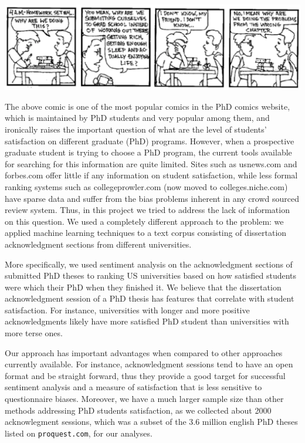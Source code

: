 \begin{center}
\includegraphics[scale=0.5]{img/phd1029.pdf}
\end{center}


The above comic is one of the most popular comics in the PhD comics
website, which is maintained by PhD students and very popular among
them, and ironically raises the important question of what are the
level of students' satisfaction on different graduate (PhD) programs.
However, when a prospective graduate student is trying to choose a
PhD program, the current tools available for searching for this information
are quite limited. Sites such as usnews.com and forbes.com offer little
if any information on student satisfaction, while less formal ranking
systems such as collegeprowler.com (now moved to colleges.niche.com)
have sparse data and suffer from the bias problems inherent in any
crowd sourced review system. Thus, in this project we tried to address
the lack of information on this question. We used a completely different
approach to the problem: we applied machine learning techniques to
a text corpus consisting of dissertation acknowledgment sections from
different universities. 

More specifically, we used sentiment analysis on the acknowledgment
sections of submitted PhD theses to ranking US universities based
on how satisfied students were which their PhD when they finished
it. We believe that the dissertation acknowledgment session of a PhD
thesis has features that correlate with student satisfaction. For
instance, universities with longer and more positive acknowledgments
likely have more satisfied PhD student than universities with more
terse ones.

Our approach has important advantages when compared to other approaches
currently available. For instance, acknowledgment sessions tend to
have an open format and be straight forward, thus they provide a good
target for successful sentiment analysis and a measure of satisfaction
that is less sensitive to questionnaire biases. Moreover, we have
a much larger sample size than other methods addressing PhD students
satisfaction, as we collected about 2000 acknowlegment sessions, which
was a subset of the 3.6 million english PhD theses listed on \verb|proquest.com|,
for our analyses.
